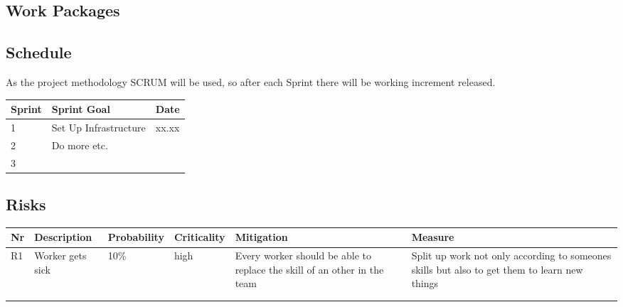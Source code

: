 \subsection{Work Packages}

\subsection{Schedule}
As the project methodology SCRUM will be used, so after each Sprint there will be  working increment released.

\begin{table}[htb!]
\begin{tabular}{lll}
\textbf{Sprint} & \textbf{Sprint Goal} & \textbf{Date} \\
\hline
1      & Set Up Infrastructure & xx.xx \\
2      & Do more etc.          &            \\
3       &                       &           
\end{tabular}
\end{table}

\subsection{Risks}
\begin{table}[htb!]
\begin{tabularx}{\textwidth}{llllXX}
\textbf{Nr} & \textbf{Description} & \textbf{Probability} & \textbf{Criticality} & \textbf{Mitigation}                                                      & \textbf{Measure}                                                                             \\
\hline
R1          & Worker gets sick     & 10\%                 & high                 & Every worker should be able to replace the skill of an other in the team & Split up work not only according to someones skills but also to get them to learn new things \\
            &                      &                      &                      &                                                                          &                                                                                              \\
            &                      &                      &                      &                                                                          &                                                                                             
\end{tabularx}
\end{table}
